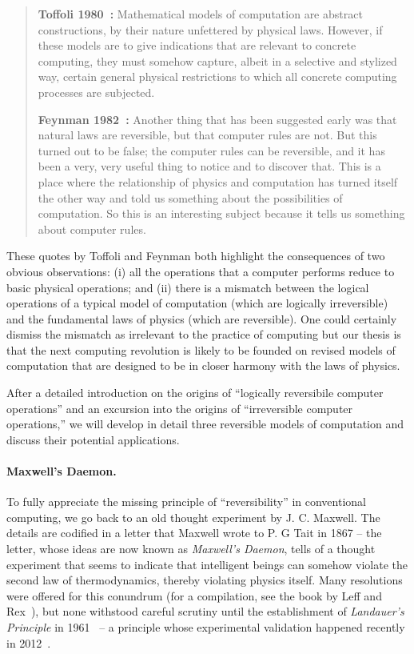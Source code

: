 \documentclass{article}
\begin{document}
\begin{quote}
  \textbf{Toffoli 1980~\cite{toffoli:1980}:} Mathematical models of
  computation are abstract constructions, by their nature unfettered
  by physical laws. However, if these models are to give indications
  that are relevant to concrete computing, they must somehow capture,
  albeit in a selective and stylized way, certain general physical
  restrictions to which all concrete computing processes are
  subjected.

  \textbf{Feynman 1982~\cite{springerlink:10.1007/bf02650179}:}
  Another thing that has been suggested early was that natural laws
  are reversible, but that computer rules are not. But this turned out
  to be false; the computer rules can be reversible, and it has been a
  very, very useful thing to notice and to discover that. This is a
  place where the relationship of physics and computation has turned
  itself the other way and told us something about the possibilities
  of computation. So this is an interesting subject because it tells
  us something about computer rules.
\end{quote}

\noindent These quotes by Toffoli and Feynman both highlight the
consequences of two obvious observations: (i) all the operations that
a computer performs reduce to basic physical operations; and (ii)
there is a mismatch between the logical operations of a typical model
of computation (which are logically irreversible) and the fundamental
laws of physics (which are reversible). One could certainly dismiss
the mismatch as irrelevant to the practice of computing but our thesis
is that the next computing revolution is likely to be founded on
revised models of computation that are designed to be in closer harmony
with the laws of physics.

After a detailed introduction on the origins of ``logically
reversibile computer operations'' and an excursion into the origins of
``irreversible computer operations,'' we will develop in detail three
reversible models of computation and discuss their potential
applications.

\paragraph*{Maxwell's Daemon.}
To fully appreciate the missing principle of ``reversibility'' in
conventional computing, we go back to an old thought experiment by
J. C. Maxwell. The details are codified in a letter that Maxwell wrote
to P. G Tait in 1867 -- the letter, whose ideas are now known as
\emph{Maxwell's Daemon}, tells of a thought experiment that seems to
indicate that intelligent beings can somehow violate the second law of
thermodynamics, thereby violating physics itself. Many resolutions
were offered for this conundrum (for a compilation, see the book by
Leff and Rex~\cite{leff1990}), but none withstood careful scrutiny
until the establishment of \emph{Landauer's Principle} in
1961~\cite{Landauer:1961} -- a principle whose experimental validation
happened recently in 2012~\cite{berut2012experimental}.
\end{document}
